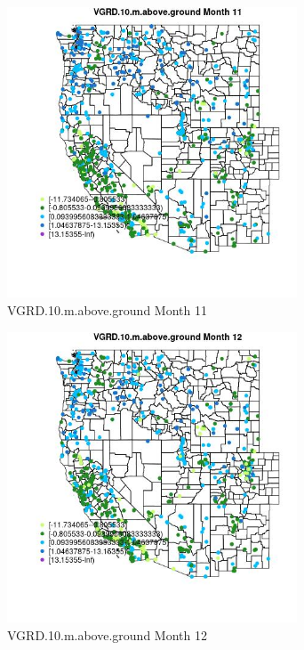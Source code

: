 \begin{figure} 
\centering  
\includegraphics[width=0.77\textwidth]{Code_Outputs/Report_ML_input_PM25_Step4_part_f_de_duplicated_aves_prioritize_24hr_obswNAs_MapObsMo11VGRD10maboveground.jpg} 
\caption{\label{fig:Report_ML_input_PM25_Step4_part_f_de_duplicated_aves_prioritize_24hr_obswNAsMapObsMo11VGRD10maboveground}VGRD.10.m.above.ground Month 11} 
\end{figure} 
 

\begin{figure} 
\centering  
\includegraphics[width=0.77\textwidth]{Code_Outputs/Report_ML_input_PM25_Step4_part_f_de_duplicated_aves_prioritize_24hr_obswNAs_MapObsMo12VGRD10maboveground.jpg} 
\caption{\label{fig:Report_ML_input_PM25_Step4_part_f_de_duplicated_aves_prioritize_24hr_obswNAsMapObsMo12VGRD10maboveground}VGRD.10.m.above.ground Month 12} 
\end{figure} 
 

